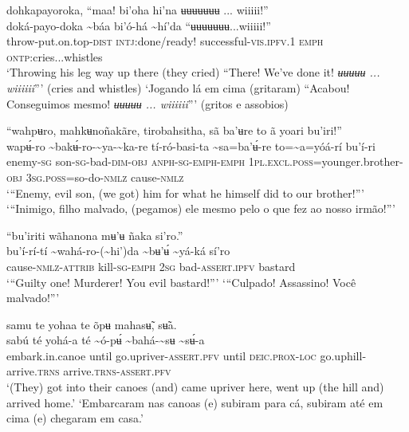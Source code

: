 \documentclass[output=paper,
modfonts,nonflat
]{langsci/langscibook}
\begin{document}
\largerpage
\ea dohkapayoroka, “maa! bi'oha hi'na ʉʉʉʉʉʉʉ ... wiiiii!” \\[.3em]
\gll doká-payo-doka{\footnotemark}	{\textasciitilde}báa	bi'ó-há	{\textasciitilde}hí'da	“ʉʉʉʉʉʉʉ...wiiiii!” \\
     throw-put.on.top-\textsc{dist}	\textsc{intj}:done/ready!	successful-\textsc{vis.ipfv.}1	\textsc{emph}	\textsc{ontp:}cries...whistles\\
\glt ‘Throwing his leg way up there (they cried) “There! We've done it! \textit{ʉʉʉʉʉ ... wiiiiii}”' (cries and whistles)
\newpage
\glt ‘Jogando lá em cima (gritaram) “Acabou! Conseguimos mesmo! \textit{ʉʉʉʉʉ ... wiiiiii}”' (gritos e assobios)
\z 

\ea“wahpʉro, mahkʉnoñakãre, tirobahsitha, sã ba'ʉre to ã yoari bu'iri!” \\[.3em]
\gll wapʉ́-ro	{\textasciitilde}bakʉ́-ro-{\textasciitilde}ya-{\textasciitilde}ka-re	tí-ró-basi-ta	{\textasciitilde}sa=ba'ʉ́-re to={\textasciitilde}a=yóá-rí	bu'í-ri \\
     enemy\textsc{-sg}	son\textsc{-sg}-bad\textsc{-dim-obj}	\textsc{anph-sg-emph-emph}	1\textsc{pl.excl.poss}=younger.brother\textsc{-obj} 3\textsc{sg.poss}=so-do\textsc{-nmlz}	cause\textsc{-nmlz}\\
\glt ‘“Enemy, evil son, (we got) him for what he himself did to our brother!”’
\glt ‘“Inimigo, filho malvado, (pegamos) ele mesmo pelo o que fez ao nosso irmão!”’
\z 

\ea “bu'iriti wãhanona mʉ'ʉ ñaka si'ro.” \\[.3em]
\gll bu'í-rí-tí	{\textasciitilde}wahá-ro-({\textasciitilde}hi')da	{\textasciitilde}bʉ'ʉ́	{\textasciitilde}yá-ká	sí'ro \\
     cause\textsc{-nmlz-attrib}	kill\textsc{-sg-emph}	2\textsc{sg}	bad-\textsc{assert.ipfv}	bastard\\
\glt ‘“Guilty one! Murderer! You evil bastard!”’
\glt ‘“Culpado! Assassino! Você malvado!”’
\z 

\ea samu te yohaa te õpʉ mahasʉ̃, sʉ̃a.   \\[.3em]
\gll {\textasciitilde}sabú	té	yohá-a	té	{\textasciitilde}ó-pʉ́	{\textasciitilde}bahá-{\textasciitilde}sʉ	{\textasciitilde}sʉ́-a \\
     embark.in.canoe	until	go.upriver-\textsc{assert.pfv}	until	\textsc{deic.prox-loc}	go.uphill-arrive.\textsc{trns}	arrive.\textsc{trns}-\textsc{assert.pfv}\\
\glt ‘(They) got into their canoes (and) came upriver here, went up (the hill and) arrived home.’
\glt ‘Embarcaram nas canoas (e) subiram para cá, subiram até em cima (e) chegaram em casa.’
\z 
\end{document}
